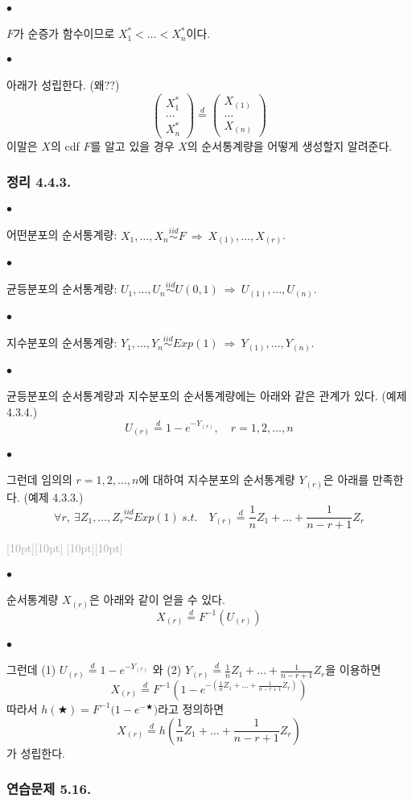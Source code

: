 \documentclass[12pt,oneside,english]{book}
\newcommand{\rdash}{\noindent \textcolor{darkgray}{ \raisebox{-1.9pt}[10pt][10pt]{\leafright} \hrulefill \raisebox{-1.9pt}[10pt][10pt]{\leafright \decofourleft \decothreeleft  \aldineright \decotwo \floweroneleft \decoone}}}
\def\ck{\paragraph{\Large$\bullet$}\Large}
\begin{document}
\ck $F$가 순증가 함수이므로 $X_1^*<\dots<X_n^*$이다. 

\ck 아래가 성립한다. (왜??)
\[
\begin{pmatrix}
X_1^* \\ \dots \\ X_n^*
\end{pmatrix}\overset{d}{=}
\begin{pmatrix}
X_{(1)} \\ \dots \\ X_{(n)}
\end{pmatrix}
\]
이말은 $X$의 cdf $F$를 알고 있을 경우 $X$의 순서통계량을 어떻게 생성할지 알려준다. 

\subsubsection{정리 4.4.3.} 

\ck 어떤분포의 순서통계량: $X_1,\dots,X_n \overset{iid}{\sim} F ~ \Longrightarrow ~ X_{(1)},\dots,X_{(r)}$.
\ck 균등분포의 순서통계량: $U_1,\dots,U_n \overset{iid}{\sim} U(0,1) ~ \Longrightarrow ~ U_{(1)},\dots,U_{(n)}$. 

\ck 지수분포의 순서통계량: $Y_1,\dots,Y_n \overset{iid}{\sim} Exp(1) ~ \Longrightarrow ~ Y_{(1)},\dots,Y_{(n)}$. 

\ck 균등분포의 순서통계량과 지수분포의 순서통계량에는 아래와 같은 관계가 있다. (예제 4.3.4.)
\[
U_{(r)}\overset{d}{=}1-e^{-Y_{(r)}}, \quad r=1,2,\dots,n
\]

\ck 그런데 임의의 $r=1,2,\dots,n$에 대하여 지수분포의 순서통계량 $Y_{(r)}$은 아래를 만족한다. (예제 4.3.3.)
\[
\forall r,~  \exists Z_1,\dots,Z_r \overset{iid}{\sim} Exp(1) ~ s.t. \quad Y_{(r)}\overset{d}{=}\frac{1}{n}Z_1+\dots+\frac{1}{n-r+1}Z_r
\]

\rdash 

\ck 순서통계량 $X_{(r)}$은 아래와 같이 얻을 수 있다. 
\[
X_{(r)}\overset{d}{=}F^{-1}(U_{(r)})
\]
\ck 그런데 (1) $U_{(r)}\overset{d}{=}1-e^{-Y_{(r)}}$ 와 (2) $Y_{(r)}\overset{d}{=}\frac{1}{n}Z_1+\dots+\frac{1}{n-r+1}Z_r$을 이용하면 
\[
X_{(r)}\overset{d}{=}F^{-1}\left(1-e^{-(\frac{1}{n}Z_1+\dots+\frac{1}{n-r+1}Z_r)}\right)
\]
따라서 $h(\bigstar)=F^{-1}\big(1-e^{-\bigstar}\big)$라고 정의하면 
\[
X_{(r)}\overset{d}{=}h\left(\frac{1}{n}Z_1+\dots+\frac{1}{n-r+1}Z_r\right)
\]
가 성립한다. 

\subsubsection{연습문제 5.16.}
\end{document}
